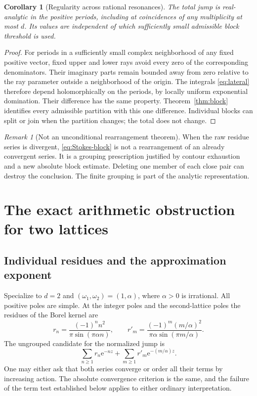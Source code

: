 \documentclass[11pt,a4paper]{article}
\numberwithin{equation}{section}
\newtheorem{corollary}[theorem]{Corollary}
\theoremstyle{definition}
\theoremstyle{remark}
\newtheorem{remark}[theorem]{Remark}
\newcommand{\e}{\mathrm e}
\begin{document}
\begin{corollary}[Regularity across rational resonances]
\label{cor:parameter}
The total jump is real-analytic in the positive periods, including at
coincidences of any multiplicity at most $d$. Its values are independent
of which sufficiently small admissible block threshold is used.
\end{corollary}
\begin{proof}
For periods in a sufficiently small complex neighborhood of any fixed
positive vector, fixed upper and lower rays avoid every zero of the
corresponding denominators. Their imaginary parts remain bounded away
from zero relative to the ray parameter outside a neighborhood of the
origin. The integrals \eqref{eq:lateral} therefore depend holomorphically
on the periods, by locally uniform exponential domination. Their
difference has the same property. Theorem~\ref{thm:block} identifies every
admissible partition with this one difference. Individual blocks can
split or join when the partition changes; the total does not change.
\end{proof}

\begin{remark}[Not an unconditional rearrangement theorem]
When the raw residue series is divergent, \eqref{eq:Stokes-block} is not a
rearrangement of an already convergent series. It is a grouping prescription
justified by contour exhaustion and a new absolute block estimate.
Deleting one member of each close pair can destroy the conclusion. The
finite grouping is part of the analytic representation.
\end{remark}

\section{The exact arithmetic obstruction for two lattices}
\label{sec:arithmetic}

\subsection{Individual residues and the approximation exponent}
Specialize to $d=2$ and $(\omega_1,\omega_2)=(1,\alpha)$, where
$\alpha>0$ is irrational. All positive poles are simple. At the integer
poles and the second-lattice poles the residues of the Borel kernel are
\begin{equation}
 r_n=\frac{(-1)^n n^2}{\pi\sin(\pi\alpha n)},\qquad
 r'_m=\frac{(-1)^m(m/\alpha)^2}{\pi\alpha\sin(\pi m/\alpha)}.
 \label{eq:rawres}
\end{equation}
The ungrouped candidate for the normalized jump is
\begin{equation}
 \sum_{n\ge1}r_n\e^{-nz}
 +\sum_{m\ge1}r'_m\e^{-(m/\alpha)z}.
 \label{eq:rawseries}
\end{equation}
One may either ask that both series converge or order all their terms by
increasing action. The absolute convergence criterion is the same, and
the failure of the term test established below applies to either ordinary
interpretation.
\end{document}
